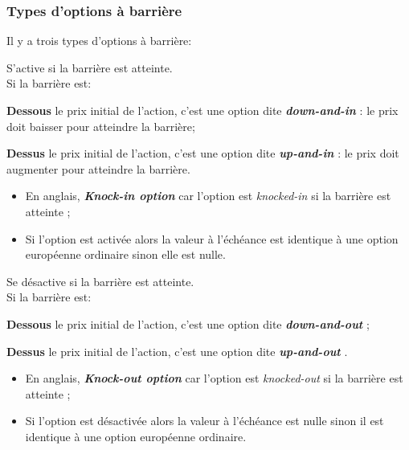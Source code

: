 \documentclass[10pt, french]{article}
\begin{document}
\begin{multicols*}{2}
\subsubsection*{Types d'options à barrière}

Il y a trois types d'options à barrière:
\begin{definitionNOHFILLsub}
S'active si la barrière est atteinte.\\

Si la barrière est:
\begin{description}
	\item	\textbf{Dessous} le prix initial de l'action, c'est une option dite \og \textit{\textbf{down-and-in}} \fg{}: le prix doit baisser pour atteindre la barrière;
	\item	\textbf{Dessus} le prix initial de l'action, c'est une option dite \og \textit{\textbf{up-and-in}} \fg{}: le prix doit augmenter pour atteindre la barrière.
\end{description}

\tcbline

\begin{itemize}[leftmargin = *]
\item	En anglais, \og \textit{\textbf{Knock-in option}} \fg{} car l'option est \og \textit{knocked-in} si la barrière est atteinte \fg{};
	\item	Si l'option est activée alors la valeur à l'échéance est identique à une option européenne ordinaire sinon elle est nulle.
\end{itemize}
\end{definitionNOHFILLsub}


\begin{definitionNOHFILLsub}
Se désactive si la barrière est atteinte.\\

Si la barrière est:
\begin{description}
	\item	\textbf{Dessous} le prix initial de l'action, c'est une option dite \og \textit{\textbf{down-and-out}} \fg{};
	\item	\textbf{Dessus} le prix initial de l'action, c'est une option dite \og \textit{\textbf{up-and-out}} \fg{}.
\end{description}

\tcbline

\begin{itemize}[leftmargin = *]
	\item	En anglais, \og \textit{\textbf{Knock-out option}} \fg{} car l'option est \og \textit{knocked-out} si la barrière est atteinte \fg{};
	\item	Si l'option est désactivée alors la valeur à l'échéance est nulle sinon il est identique  à une option européenne ordinaire.
\end{itemize}
\end{definitionNOHFILLsub}



\end{multicols*}
\end{document}
